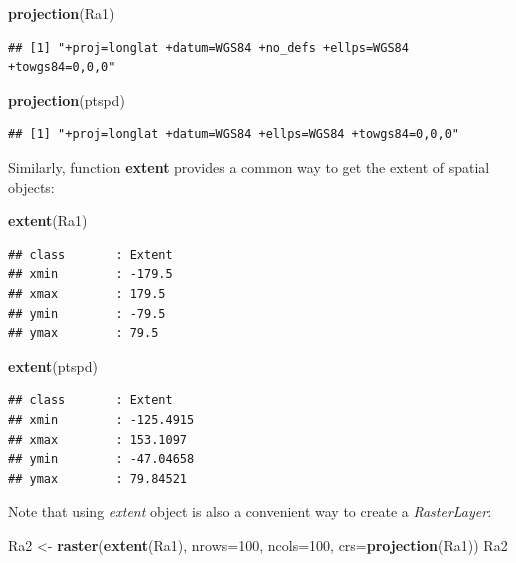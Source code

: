\documentclass[]{report}
\newenvironment{Shaded}{\begin{snugshade}}{\end{snugshade}}
\newcommand{\KeywordTok}[1]{\textcolor[rgb]{0.13,0.29,0.53}{\textbf{{#1}}}}
\newcommand{\DataTypeTok}[1]{\textcolor[rgb]{0.13,0.29,0.53}{{#1}}}
\newcommand{\DecValTok}[1]{\textcolor[rgb]{0.00,0.00,0.81}{{#1}}}
\newcommand{\StringTok}[1]{\textcolor[rgb]{0.31,0.60,0.02}{{#1}}}
\newcommand{\NormalTok}[1]{{#1}}
\begin{document}
\begin{Shaded}
\begin{Highlighting}[]
\KeywordTok{projection}\NormalTok{(Ra1)}
\end{Highlighting}
\end{Shaded}

\begin{verbatim}
## [1] "+proj=longlat +datum=WGS84 +no_defs +ellps=WGS84 +towgs84=0,0,0"
\end{verbatim}

\begin{Shaded}
\begin{Highlighting}[]
\KeywordTok{projection}\NormalTok{(ptspd)}
\end{Highlighting}
\end{Shaded}

\begin{verbatim}
## [1] "+proj=longlat +datum=WGS84 +ellps=WGS84 +towgs84=0,0,0"
\end{verbatim}

Similarly, function \textbf{extent} provides a common way to get the
extent of spatial objects:

\begin{Shaded}
\begin{Highlighting}[]
\KeywordTok{extent}\NormalTok{(Ra1)}
\end{Highlighting}
\end{Shaded}

\begin{verbatim}
## class       : Extent 
## xmin        : -179.5 
## xmax        : 179.5 
## ymin        : -79.5 
## ymax        : 79.5
\end{verbatim}

\begin{Shaded}
\begin{Highlighting}[]
\KeywordTok{extent}\NormalTok{(ptspd)}
\end{Highlighting}
\end{Shaded}

\begin{verbatim}
## class       : Extent 
## xmin        : -125.4915 
## xmax        : 153.1097 
## ymin        : -47.04658 
## ymax        : 79.84521
\end{verbatim}

Note that using \emph{extent} object is also a convenient way to create
a \emph{RasterLayer}:

\begin{Shaded}
\begin{Highlighting}[]
\NormalTok{Ra2 <-}\StringTok{ }\KeywordTok{raster}\NormalTok{(}\KeywordTok{extent}\NormalTok{(Ra1), }\DataTypeTok{nrows=}\DecValTok{100}\NormalTok{, }\DataTypeTok{ncols=}\DecValTok{100}\NormalTok{, }\DataTypeTok{crs=}\KeywordTok{projection}\NormalTok{(Ra1))}
\NormalTok{Ra2}
\end{Highlighting}
\end{Shaded}
\end{document}
